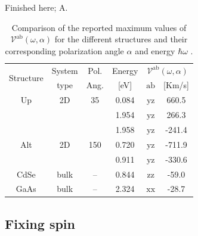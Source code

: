 \documentclass[floatfix,prb,aps,superscriptaddress,showpacs,11pt,preprint,letterpaper]{revtex4}
\begin{document}
{\color{red} Finished here; A.}
\begin{table}%
\begin{tabular}{cccccc}
\hline
\multirow{2}{*}{Structure \quad} & 
System \quad & 
Pol. &
Energy & 
\multicolumn{2}{c}{$\mathcal{V}^{\mathrm{ab}}(\omega,\alpha)$}\\
\cline{5-6}
& type & Ang. & [eV] & $\mathrm{ab}$ \quad & [Km/s]\\
\hline
Up  & 2D   & 35    & 0.084  & $\mathrm{yz}$ &  660.5 \\
      &      &       & 1.954  & $\mathrm{yz}$ &  266.3 \\
      &      &       & 1.958  & $\mathrm{yz}$ & -241.4 \\
Alt & 2D   & 150   & 0.720  & $\mathrm{yz}$ & -711.9 \\
      &      &       & 0.911  & $\mathrm{yz}$ & -330.6 \\
CdSe  & bulk & --    & 0.844  & $\mathrm{zz}$ &  -59.0 \\
GaAs  & bulk & --    & 2.324  & $\mathrm{xx}$ &  -28.7 \\
\hline
\end{tabular}
\caption{Comparison of the reported maximum values of
$\mathcal{V}^{\mathrm{ab}}(\omega,\alpha)$ for the different structures and
their corresponding polarization angle $\alpha$ and energy $\hbar\omega$ . }
\label{tab:vab-str-comp}
\end{table}

\subsection{Fixing spin}
\label{sec:res-fixspin}
\end{document}
